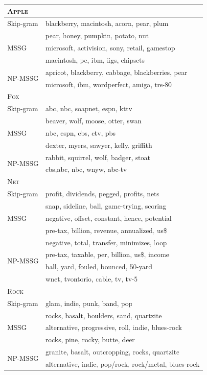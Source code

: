 \documentclass[11pt,a4paper]{article}
\begin{document}
\begin{table}[t!]
{\fontsize{7.6}{9.12} \selectfont
\begin{tabular}{|l|l|}

\multicolumn{2}{l}{\textsc{Apple}}\\ \hline
 Skip-gram  & blackberry,  macintosh, acorn, pear, plum  \\  \hline
 \multirow{3}{*}{MSSG} & pear, honey, pumpkin, potato, nut \\
 &  microsoft, activision, sony, retail,  gamestop \\ 
 &  macintosh,  pc, ibm, iigs, chipsets\\ \hline
 \multirow{2}{*}{NP-MSSG} &  apricot, blackberry, cabbage, blackberries, pear \\ 
 & microsoft, ibm,   wordperfect, amiga, trs-80\\
 \hline 

\multicolumn{2}{l}{\textsc{Fox}}\\ \hline
  Skip-gram & abc, nbc, soapnet, espn, kttv \\  \hline
 \multirow{3}{*}{MSSG} & beaver, wolf, moose, otter, swan \\
 & nbc, espn, cbs, ctv, pbs \\ 
 & dexter, myers, sawyer, kelly, griffith \\ 
 \hline
 \multirow{2}{*}{NP-MSSG} & rabbit, squirrel, wolf, badger, stoat \\
 & cbs,abc, nbc, wnyw, abc-tv \\ \hline
 
 \multicolumn{2}{l}{\textsc{Net}}\\ \hline
 Skip-gram  & profit, dividends, pegged, profits, nets \\  \hline
 \multirow{3}{*}{MSSG} & snap, sideline, ball, game-trying, scoring  \\
 & negative, offset, constant, hence, potential \\ 
 & pre-tax, billion, revenue, annualized, us\$ \\ \hline 
 \multirow{4}{*}{NP-MSSG} & negative, total, transfer, minimizes, loop \\ 
 & pre-tax, taxable, per, billion, us\$, income \\ 
 & ball, yard, fouled, bounced, 50-yard \\
 & wnet, tvontorio, cable, tv, tv-5 \\
 \hline 
 
 \multicolumn{2}{l}{\textsc{Rock}}\\ \hline
 Skip-gram  & glam, indie, punk, band, pop \\  \hline
 \multirow{3}{*}{MSSG} & rocks, basalt, boulders, sand, quartzite \\ 
 & alternative, progressive, roll, indie, blues-rock \\
 & rocks, pine, rocky, butte, deer \\ \hline
 \multirow{2}{*}{NP-MSSG} & granite, basalt, outcropping, rocks, quartzite \\ 
 & alternative, indie, pop/rock, rock/metal, blues-rock \\
\hline 
 

\end{tabular}}
\end{table}
\end{document}

